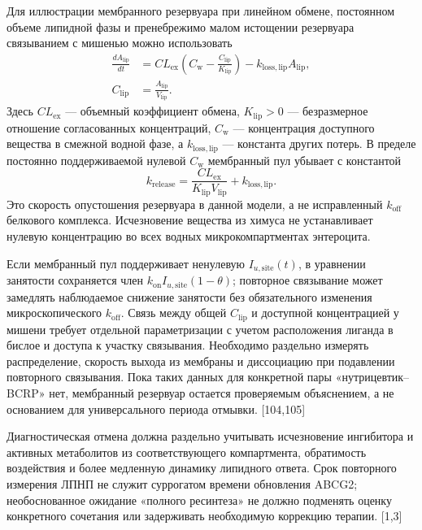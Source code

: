 \documentclass[11pt]{article}
\begin{document}
Для иллюстрации мембранного резервуара при линейном обмене, постоянном объеме липидной фазы и пренебрежимо малом истощении резервуара связыванием с мишенью можно использовать
\[
\begin{aligned}
\frac{dA_{\mathrm{lip}}}{dt}
&=CL_{\mathrm{ex}}\left(C_{\mathrm{w}}-
\frac{C_{\mathrm{lip}}}{K_{\mathrm{lip}}}\right)
-k_{\mathrm{loss,lip}}A_{\mathrm{lip}},\\
C_{\mathrm{lip}}&=\frac{A_{\mathrm{lip}}}{V_{\mathrm{lip}}}.
\end{aligned}
\]
Здесь \(CL_{\mathrm{ex}}\) --- объемный коэффициент обмена, \(K_{\mathrm{lip}}>0\) --- безразмерное отношение согласованных концентраций, \(C_{\mathrm{w}}\) --- концентрация доступного вещества в смежной водной фазе, а \(k_{\mathrm{loss,lip}}\) --- константа других потерь. В пределе постоянно поддерживаемой нулевой \(C_{\mathrm{w}}\) мембранный пул убывает с константой
\[
k_{\mathrm{release}}=
\frac{CL_{\mathrm{ex}}}{K_{\mathrm{lip}}V_{\mathrm{lip}}}
+k_{\mathrm{loss,lip}}.
\]
Это скорость опустошения резервуара в данной модели, а не исправленный \(k_{\mathrm{off}}\) белкового комплекса. Исчезновение вещества из химуса не устанавливает нулевую концентрацию во всех водных микрокомпартментах энтероцита.

Если мембранный пул поддерживает ненулевую \(I_{u,\mathrm{site}}(t)\), в уравнении занятости сохраняется член \(k_{\mathrm{on}}I_{u,\mathrm{site}}(1-\theta)\); повторное связывание может замедлять наблюдаемое снижение занятости без обязательного изменения микроскопического \(k_{\mathrm{off}}\). Связь между общей \(C_{\mathrm{lip}}\) и доступной концентрацией у мишени требует отдельной параметризации с учетом расположения лиганда в бислое и доступа к участку связывания. Необходимо раздельно измерять распределение, скорость выхода из мембраны и диссоциацию при подавлении повторного связывания. Пока таких данных для конкретной пары «нутрицевтик--BCRP» нет, мембранный резервуар остается проверяемым объяснением, а не основанием для универсального периода отмывки. [104,105]

Диагностическая отмена должна раздельно учитывать исчезновение ингибитора и активных метаболитов из соответствующего компартмента, обратимость воздействия и более медленную динамику липидного ответа. Срок повторного измерения ЛПНП не служит суррогатом времени обновления ABCG2; необоснованное ожидание «полного ресинтеза» не должно подменять оценку конкретного сочетания или задерживать необходимую коррекцию терапии. [1,3]
\end{document}
